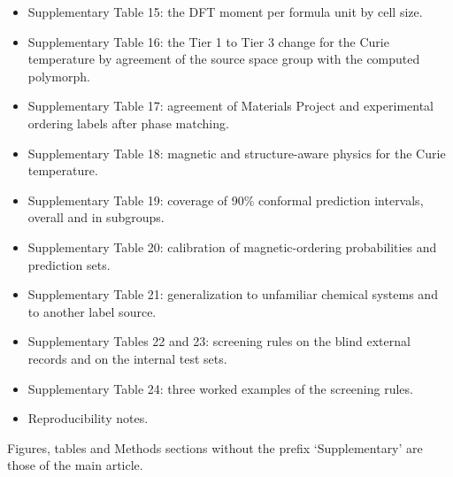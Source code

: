 \documentclass[pdflatex,sn-nature]{sn-jnl}
\begin{document}
\begin{itemize}
\item Supplementary Table 15: the DFT moment per formula unit by cell size.
\item Supplementary Table 16: the Tier 1 to Tier 3 change for the Curie temperature by agreement of the source space group with the computed polymorph.
\item Supplementary Table 17: agreement of Materials Project and experimental ordering labels after phase matching.
\item Supplementary Table 18: magnetic and structure-aware physics for the Curie temperature.
\item Supplementary Table 19: coverage of 90\% conformal prediction intervals, overall and in subgroups.
\item Supplementary Table 20: calibration of magnetic-ordering probabilities and prediction sets.
\item Supplementary Table 21: generalization to unfamiliar chemical systems and to another label source.
\item Supplementary Tables 22 and 23: screening rules on the blind external records and on the internal test sets.
\item Supplementary Table 24: three worked examples of the screening rules.
\item Reproducibility notes.
\end{itemize}

Figures, tables and Methods sections without the prefix `Supplementary' are those of the main article.
\end{document}
